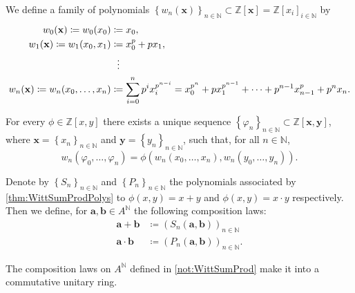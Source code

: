 \newpage
\begin{defn}
	We define a family of polynomials $\left\{ w_n(\mathbf{x}) \right\}_{n \in \mathbb{N}} \subset
	\mathbb{Z}[\mathbf{x}] = \mathbb{Z}[x_i]_{i \in \mathbb{N}}$ by
	\begin{align*}
		w_0(\mathbf{x}) \coloneqq w_0(x_0) &\coloneqq x_0, \\
		w_1(\mathbf{x}) \coloneqq w_1(x_0, x_1) &\coloneqq x_0^p + px_1, \\
				& \vdotswithin{\coloneqq} \\
		w_n(\mathbf{x}) \coloneqq w_n(x_0, \ldots, x_n) &\coloneqq
		\sum_{ i=0 }^{ n } p^i x_i^{p^{n-i}} =
		x_0^{p^n} + px_1^{p^{n-1}} + \cdots + p^{n-1}x_{n-1}^p + p^n x_n
	.\end{align*}
\end{defn}


\begin{lem}\label{thm:WittSumProdPolys}
	For every $\phi \in \mathbb{Z}[x,y]$ there exists a unique sequence
	$\left\{ \varphi_n \right\}_{n \in \mathbb{N}} \subset \mathbb{Z}[\mathbf{x}, \mathbf{y}]$,
	where $\mathbf{x} = \left\{ x_n \right\}_{n \in \mathbb{N}}$ and
	$\mathbf{y} = \left\{ y_n \right\}_{n \in \mathbb{N}}$, such that,
	for all $n \in \mathbb{N}$,
	\begin{equation*}
		w_n(\varphi_0, \ldots, \varphi_n) =
		\phi \left( w_n(x_0, \ldots, x_n), w_n(y_0, \ldots, y_n) \right)
	.\end{equation*}
\end{lem} 


\begin{ntt}[]\label{not:WittSumProd}
	Denote by $\left\{ S_n \right\}_{n \in \mathbb{N}}$ and
	$\left\{ P_n \right\}_{n \in \mathbb{N}}$ the polynomials associated 
	by \cref{thm:WittSumProdPolys} to 
	$\phi(x,y) = x + y$ and $\phi(x,y) = x \cdot y$ respectively.
	Then we define, for $\mathbf{a},\mathbf{b} \in A^{\mathbb{N}}$ the following
	composition laws:
	\begin{align*}
		\mathbf{a} + \mathbf{b} &\coloneqq
		\left( S_n(\mathbf{a},\mathbf{b}) \right)_{n \in \mathbb{N}}\\
		\mathbf{a} \cdot \mathbf{b} &\coloneqq 
		\left( P_n(\mathbf{a},\mathbf{b}) \right)_{n \in \mathbb{N}}
	.\end{align*}
\end{ntt}


\begin{thm}
	The composition laws on $A^{\mathbb{N}}$ defined in \cref{not:WittSumProd}
	make it into a commutative unitary ring.
\end{thm}


